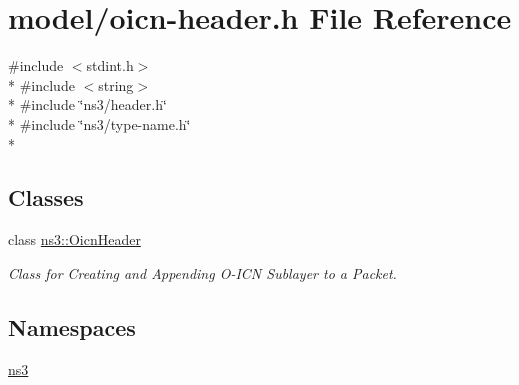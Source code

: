 \hypertarget{model_2oicn-header_8h}{\section{model/oicn-\/header.h File Reference}
\label{model_2oicn-header_8h}
}
{\ttfamily \#include $<$stdint.\-h$>$}\\*
{\ttfamily \#include $<$string$>$}\\*
{\ttfamily \#include \char`\"{}ns3/header.\-h\char`\"{}}\\*
{\ttfamily \#include \char`\"{}ns3/type-\/name.\-h\char`\"{}}\\*
\subsection*{Classes}
\begin{DoxyCompactItemize}
\item 
class \hyperlink{classns3_1_1OicnHeader}{ns3\-::\-Oicn\-Header}
\begin{DoxyCompactList}\small\item\em Class for Creating and Appending O-\/\-I\-C\-N Sublayer to a Packet. \end{DoxyCompactList}\end{DoxyCompactItemize}
\subsection*{Namespaces}
\begin{DoxyCompactItemize}
\item 
\hyperlink{namespacens3}{ns3}
\end{DoxyCompactItemize}
